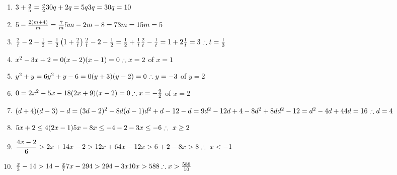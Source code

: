 \begin{eocsolutions}{}
{\begin{enumerate}[itemsep=7pt, label=\textbf{\arabic*}. ]
\begin{multicols}{2}
\begin{enumerate}[itemsep=6pt,label=\textbf{(\alph*)}]
\item $3+\frac{q}{5} = \frac{q}{2}\\30q+2q=5q\\3q=30\\q=10$
\item $5-\frac{2(m+4)}{m} = \frac{7}{m}\\ 5m-2m-8=7\\3m=15\\m=5$
\item $\frac{2}{t} - 2 - \frac{1}{2} = \frac{1}{2}\left(1+\frac{2}{t}\right)\\ \frac{2}{t} - 2 - \frac{1}{2} = \frac{1}{2} +\frac{1}{t}\\
\frac{2}{t} - \frac{1}{t} = 1+2\\
\frac{1}{t}=3\\
\therefore t=\frac{1}{3}$
\item $x^{2} - 3x + 2=0\\
(x-2)(x-1)=0\\
\therefore x = 2$ of $x=1$
\item $y^{2} + y = 6\\
y^2+y-6=0\\
(y+3)(y-2)=0\\
\therefore y=-3$ of $y=2$
\item $0=2x^{2} - 5x - 18\\
(2x+9)(x-2)=0\\ \therefore x = -\frac{9}{2}$ of $ x=2$
\item $(d+4)(d-3)-d=(3d-2)^{2} - 8d(d-1)\\
d^2+d-12-d=9d^2-12d+4-8d^2+8d\\
d^2-12 = d^2 -4d +4\\
4d=16\\
\therefore d=4$
\item $5x+2\leq4(2x-1)\\
5x-8x \leq -4-2\\
-3x \leq -6\\
\therefore~ x \geq 2$
\item $\dfrac{4x-2}{6} > 2x+1\\
4x-2 > 12x+6\\
4x-12x >6+2\\
-8x > 8\\
\therefore~x<-1$
\item $\frac{x}{3} - 14 > 14 - \frac{x}{7}\\
7x - 294 > 294-3x\\
10x > 588\\
\therefore x > \frac{588}{10}$

\end{enumerate}
\end{multicols}
\end{enumerate}}
\end{eocsolutions}
